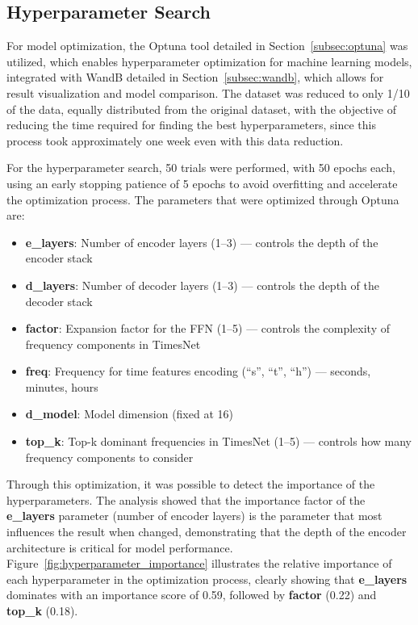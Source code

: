 \subsection{Hyperparameter Search}

For model optimization, the Optuna tool detailed in Section~\ref{subsec:optuna} was utilized, which enables hyperparameter optimization for machine learning models, integrated with WandB detailed in Section~\ref{subsec:wandb}, which allows for result visualization and model comparison. The dataset was reduced to only 1/10 of the data, equally distributed from the original dataset, with the objective of reducing the time required for finding the best hyperparameters, since this process took approximately one week even with this data reduction.

For the hyperparameter search, 50 trials were performed, with 50 epochs each, using an early stopping patience of 5 epochs to avoid overfitting and accelerate the optimization process. The parameters that were optimized through Optuna are:

\begin{itemize}
    \item \textbf{e\_layers}: Number of encoder layers (1--3) --- controls the depth of the encoder stack
    \item \textbf{d\_layers}: Number of decoder layers (1--3) --- controls the depth of the decoder stack  
    \item \textbf{factor}: Expansion factor for the FFN (1--5) --- controls the complexity of frequency components in TimesNet
    \item \textbf{freq}: Frequency for time features encoding (``s'', ``t'', ``h'') --- seconds, minutes, hours
    \item \textbf{d\_model}: Model dimension (fixed at 16)
    \item \textbf{top\_k}: Top-k dominant frequencies in TimesNet (1--5) --- controls how many frequency components to consider
\end{itemize}

Through this optimization, it was possible to detect the importance of the hyperparameters. The analysis showed that the importance factor of the \textbf{e\_layers} parameter (number of encoder layers) is the parameter that most influences the result when changed, demonstrating that the depth of the encoder architecture is critical for model performance. Figure~\ref{fig:hyperparameter_importance} illustrates the relative importance of each hyperparameter in the optimization process, clearly showing that \textbf{e\_layers} dominates with an importance score of 0.59, followed by \textbf{factor} (0.22) and \textbf{top\_k} (0.18).


